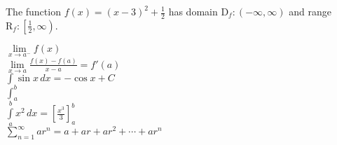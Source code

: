 \documentclass[10pt,a4paper]{article}
\begin{document}
The function $f(x)=(x-3)^2 + \frac{1}{2}$ has domain $\mathrm{D}_f:(-\infty,\infty)$ and range $\mathrm{R}_f:\left[\frac{1}{2}, \infty\right)$.

\vspace{10pt}

$\lim \limits_{x \to a^-}f(x)$\\


$\displaystyle{\lim \limits_{x \to a} \frac{f(x)-f(a)}{x-a}=f'(a)}$\\

$\displaystyle{\int \sin x\,dx = -\cos x + C}$\\ %

$\displaystyle{\int_a^b}$\\

$\displaystyle{\int \limits_{a}^{b}x^2\,dx=\left[\frac{x^3}{3}\right]_{a}^{b}}$\\

$\displaystyle{\sum \limits_{n=1}^{\infty}}ar^n=a+ar+ar^2+\cdots+ar^n$
\end{document}
